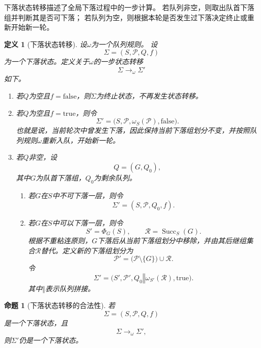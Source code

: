 \documentclass[UTF8,fontset=none]{ctexart}
\theoremstyle{cnthm}
\newtheorem{definition}{定义}[section]
\newtheorem{proposition}{命题}[section]
\begin{document}
			下落状态转移描述了全局下落过程中的一步计算。
			若队列非空，则取出队首下落组并判断其是否可下落；
			若队列为空，则根据本轮是否发生过下落决定终止或重新开始新一轮。
			
			\begin{definition}[下落状态转移]
				设$\omega$为一个队列规则。
				设
				$$
				\Sigma=(S,\mathcal{P},Q,f)
				$$
				为一个下落状态。定义关于$\omega$的一步状态转移
				$$
				\Sigma\longrightarrow_\omega \Sigma'
				$$
				如下。
				
				\begin{enumerate}
					\item 若$Q$为空且$f=\mathrm{false}$，则$\Sigma$为终止状态，不再发生状态转移。
					
					\item 若$Q$为空且$f=\mathrm{true}$，则令
					$$
					\Sigma'
					=
					\bigl(S,\mathcal{P},\omega_S(\mathcal{P}),\mathrm{false}\bigr).
					$$
					也就是说，当前轮次中曾发生下落，因此保持当前下落组划分不变，并按照队列规则$\omega$重新入队，开始新一轮。
					
					\item 若$Q$非空，设
					$$
					Q=(G,Q_0),
					$$
					其中$G$为队首下落组，$Q_0$为剩余队列。
					
					\begin{enumerate}
						\item 若$G$在$S$中不可下落一层，则令
						$$
						\Sigma'
						=
						(S,\mathcal{P},Q_0,f).
						$$
						
						\item 若$G$在$S$中可以下落一层，则令
						$$
						S'=\Phi_G(S),
						\qquad
						\mathcal{R}=\operatorname{Succ}_S(G).
						$$
						根据不重粘连原则，$G$下落后从当前下落组划分中移除，并由其后继组集合$\mathcal{R}$替代。定义新的下落组划分为
						$$
						\mathcal{P}'
						=
						\bigl(\mathcal{P}\setminus\{G\}\bigr)
						\cup
						\mathcal{R}.
						$$
						令
						$$
						\Sigma'
						=
						\bigl(
						S',
						\mathcal{P}',
						Q_0\mathbin{\Vert}\omega_{S'}(\mathcal{R}),
						\mathrm{true}
						\bigr).
						$$
						其中$\mathbin{\Vert}$表示队列拼接。
					\end{enumerate}
				\end{enumerate}
			\end{definition}
			
			\begin{proposition}[下落状态转移的合法性]
				若
				$$
				\Sigma=(S,\mathcal{P},Q,f)
				$$
				是一个下落状态，且
				$$
				\Sigma\longrightarrow_\omega \Sigma',
				$$
				则$\Sigma'$仍是一个下落状态。
			\end{proposition}
			
\end{document}
